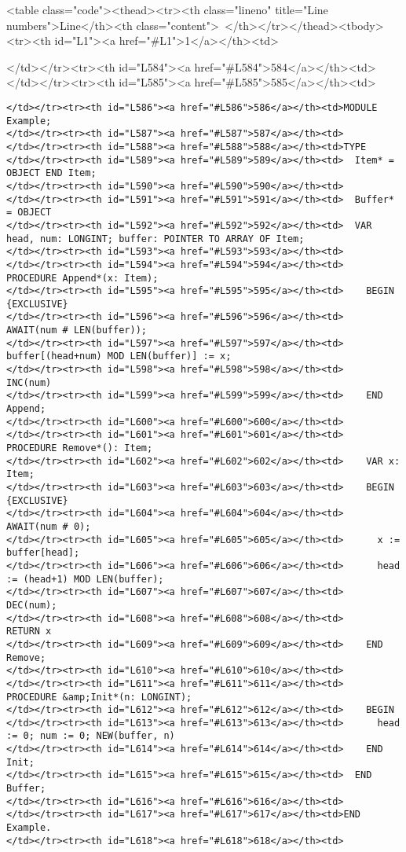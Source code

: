<table class="code"><thead><tr><th class="lineno" title="Line numbers">Line</th><th class="content"> </th></tr></thead><tbody><tr><th id="L1"><a href="#L1">1</a></th><td>\documentclass[a4paper,11pt]{article}
\begin{document}
</td></tr><tr><th id="L584"><a href="#L584">584</a></th><td>
</td></tr><tr><th id="L585"><a href="#L585">585</a></th><td>\begin{lstlisting}[language=Oberon,frame=none,caption={Bounded-buffer}]
</td></tr><tr><th id="L586"><a href="#L586">586</a></th><td>MODULE Example;
</td></tr><tr><th id="L587"><a href="#L587">587</a></th><td>
</td></tr><tr><th id="L588"><a href="#L588">588</a></th><td>TYPE
</td></tr><tr><th id="L589"><a href="#L589">589</a></th><td>  Item* = OBJECT END Item;
</td></tr><tr><th id="L590"><a href="#L590">590</a></th><td>
</td></tr><tr><th id="L591"><a href="#L591">591</a></th><td>  Buffer* = OBJECT
</td></tr><tr><th id="L592"><a href="#L592">592</a></th><td>  VAR head, num: LONGINT; buffer: POINTER TO ARRAY OF Item;
</td></tr><tr><th id="L593"><a href="#L593">593</a></th><td>
</td></tr><tr><th id="L594"><a href="#L594">594</a></th><td>    PROCEDURE Append*(x: Item);
</td></tr><tr><th id="L595"><a href="#L595">595</a></th><td>    BEGIN {EXCLUSIVE}
</td></tr><tr><th id="L596"><a href="#L596">596</a></th><td>      AWAIT(num # LEN(buffer));
</td></tr><tr><th id="L597"><a href="#L597">597</a></th><td>      buffer[(head+num) MOD LEN(buffer)] := x;
</td></tr><tr><th id="L598"><a href="#L598">598</a></th><td>      INC(num)
</td></tr><tr><th id="L599"><a href="#L599">599</a></th><td>    END Append;
</td></tr><tr><th id="L600"><a href="#L600">600</a></th><td>
</td></tr><tr><th id="L601"><a href="#L601">601</a></th><td>    PROCEDURE Remove*(): Item;
</td></tr><tr><th id="L602"><a href="#L602">602</a></th><td>    VAR x: Item;
</td></tr><tr><th id="L603"><a href="#L603">603</a></th><td>    BEGIN {EXCLUSIVE}
</td></tr><tr><th id="L604"><a href="#L604">604</a></th><td>      AWAIT(num # 0);
</td></tr><tr><th id="L605"><a href="#L605">605</a></th><td>      x := buffer[head];
</td></tr><tr><th id="L606"><a href="#L606">606</a></th><td>      head := (head+1) MOD LEN(buffer);
</td></tr><tr><th id="L607"><a href="#L607">607</a></th><td>      DEC(num);
</td></tr><tr><th id="L608"><a href="#L608">608</a></th><td>      RETURN x
</td></tr><tr><th id="L609"><a href="#L609">609</a></th><td>    END Remove;
</td></tr><tr><th id="L610"><a href="#L610">610</a></th><td>
</td></tr><tr><th id="L611"><a href="#L611">611</a></th><td>    PROCEDURE &amp;Init*(n: LONGINT);
</td></tr><tr><th id="L612"><a href="#L612">612</a></th><td>    BEGIN
</td></tr><tr><th id="L613"><a href="#L613">613</a></th><td>      head := 0; num := 0; NEW(buffer, n)
</td></tr><tr><th id="L614"><a href="#L614">614</a></th><td>    END Init;
</td></tr><tr><th id="L615"><a href="#L615">615</a></th><td>  END Buffer;
</td></tr><tr><th id="L616"><a href="#L616">616</a></th><td>
</td></tr><tr><th id="L617"><a href="#L617">617</a></th><td>END Example.
</td></tr><tr><th id="L618"><a href="#L618">618</a></th><td>\end{lstlisting}
\end{document}
